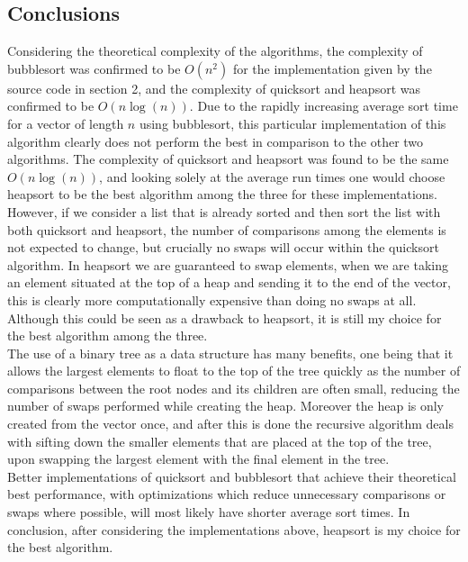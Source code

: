\documentclass[a4paper, 12pt]{article}
\begin{document}
\subsection{Conclusions}
Considering the theoretical complexity of the algorithms, the complexity of bubblesort was confirmed to be $O(n^2)$ for the implementation given by the source code in section 2, and the complexity of quicksort and heapsort was confirmed to be $O(n\log(n))$. Due to the rapidly increasing average sort time for a vector of length $n$ using bubblesort, this particular implementation of this algorithm clearly does not perform the best in comparison to the other two algorithms. The complexity of quicksort and heapsort was found to be the same $O(n\log(n))$, and looking solely at the average run times one would choose heapsort to be the best algorithm among the three for these implementations.\\

However, if we consider a list that is already sorted and then sort the list with both quicksort and heapsort, the number of comparisons among the elements is not expected to change, but crucially no swaps will occur within the quicksort algorithm. In heapsort we are guaranteed to swap elements, when we are taking an element situated at the top of a heap and sending it to the end of the vector, this is clearly more computationally expensive than doing no swaps at all. Although this could be seen as a drawback to heapsort, it is still my choice for the best algorithm among the three. \\

The use of a binary tree as a data structure has many benefits, one being that it allows the largest elements to float to the top of the tree quickly as the number of comparisons between the root nodes and its children are often small, reducing the number of swaps performed while creating the heap. Moreover the heap is only created from the vector once, and after this is done the recursive algorithm deals with sifting down the smaller elements that are placed at the top of the tree, upon swapping the largest element with the final element in the tree.\\     
 
Better implementations of quicksort and bubblesort that achieve their theoretical best performance, with optimizations which reduce unnecessary comparisons or swaps where possible, will most likely have shorter average sort times. In conclusion, after considering the implementations above, heapsort is my choice for the best algorithm.   
 
\end{document}
